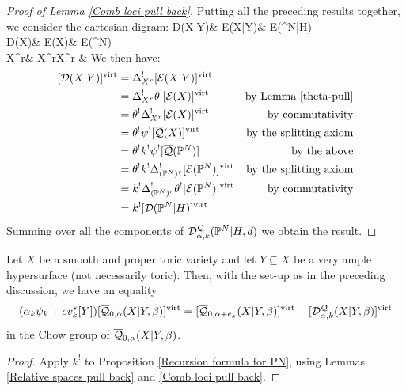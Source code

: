\begin{proof}[Proof of Lemma \ref{Comb loci pull back}] Putting all the preceding results together, we consider the cartesian digram:
\bcd
\mathcal D(X|Y)\ar[d]\ar[r] & \mathcal E(X|Y)\ar[d]\ar[r] & \mathcal E(\PP^N|H)\ar[d,"\theta"] \\
\mathcal D(X)\ar[d]\ar[r] & \mathcal E(X)\ar[d]\ar[r] & \mathcal E(\PP^N) \\
X^r\ar[r,"\Delta_{X^r}"] & X^r\times X^r & {}
\ecd
We then have:
\begin{align*} [\mathcal D(X|Y)]^{\operatorname{virt}} & = \Delta_{X^r}^! [\mathcal E(X|Y)]^{\operatorname{virt}} & \\
& =  \Delta_{X^r}^! \theta^![\mathcal E(X)]^{\operatorname{virt}} & \text{by Lemma \ref{theta-pull}} \\
& =  \theta^!\Delta_{X^r}^! [\mathcal E(X)]^{\operatorname{virt}} & \text{by commutativity} \\
& =  \theta^!\psi^![\overline{\mathcal{Q}}(X)]^{\operatorname{virt}} & \text{by the splitting axiom} \\
& =  \theta^!k^!\psi^![\overline{\mathcal{Q}}(\mathbb P^N)] & \text{by the above} \\
& =  \theta^!k^!\Delta_{(\mathbb P^N)^r}^![\mathcal E(\mathbb P^N)]^{\operatorname{virt}} & \text{by the splitting axiom} \\
& =  k^!\Delta_{(\mathbb P^N)^r}^!\theta^![\mathcal E(\mathbb P^N)]^{\operatorname{virt}} & \text{by commutativity} \\
& =  k^![\mathcal D(\mathbb P^N|H)]^{\operatorname{virt}}
\end{align*}
Summing over all the components of $\mathcal{D}^{\mathcal{Q}}_{\alpha,k}(\mathbb P^N|H,d)$ we obtain the result. \end{proof}

\begin{thm} Let $X$ be a smooth and proper toric variety and let $Y \subseteq X$ be a very ample hypersurface (not necessarily toric). Then, with the set-up as in the preceding discussion, we have an equality
\begin{equation*} (\alpha_k \psi_k + ev_k^* [Y]) [\overline{\mathcal Q}_{0,\alpha}(X|Y,\beta)]^{\operatorname{virt}} = [\overline{\mathcal Q}_{0,\alpha+e_k}(X|Y,\beta)]^{\operatorname{virt}} + [\mathcal D^\mathcal{Q}_{\alpha,k}(X|Y,\beta)]^{\operatorname{virt}} \end{equation*}
in the Chow group of $\overline{\mathcal Q}_{0,\alpha}(X|Y,\beta)$. \end{thm}
\begin{proof} Apply $k^!$ to Proposition \ref{Recursion formula for PN}, using Lemmas \ref{Relative spaces pull back} and \ref{Comb loci pull back}. \end{proof}